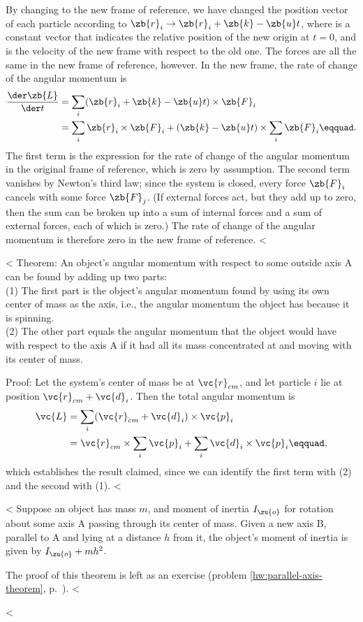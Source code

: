 By changing to the new frame of reference, we have changed
the position vector of each particle according to $\zb{r}_i \rightarrow \zb{r}_i+\zb{k}-\zb{u}t$,
where  is a constant vector that indicates the relative position of the new
origin at $t=0$, and  is the velocity of the new frame with respect to the old one.
The forces are all the same in the new frame of reference, however.
In the new frame, the rate of change of the angular momentum is
\begin{align*}
		\frac{\der\zb{L}}{\der t}	&= \sum_i
				(\zb{r}_i+\zb{k}-\zb{u}t)\times\zb{F}_i \\
		&= \sum_i \zb{r}_i\times\zb{F}_i
			+ (\zb{k}-\zb{u}t) \times \sum_i \zb{F}_i\eqquad.
\end{align*}
The first term is the expression for the rate of change of the angular
momentum in the original frame of reference, which is zero by
assumption. The second term vanishes by Newton's third law; since the system is
closed, every force $\zb{F}_i$ cancels with some force $\zb{F}_j$.
(If external forces act, but they add up to zero, then the sum can be
broken up into a sum of internal forces and a sum of external forces, each of
which is zero.)
The rate of change of the angular momentum is therefore zero
in the new frame of reference.
<%

<%
Theorem: An object's angular momentum with respect to some outside
axis A can be found by adding up two parts:\\
(1) The first part is the object's angular momentum
found by using its own center of mass as the axis, i.e., the
angular momentum the object has because it is spinning.\\
(2) The other part equals the angular momentum that the object
would have with respect to the axis A if it had all its mass
concentrated at and moving with its center of mass.

Proof: Let the system's center of mass be at  $\vc{r}_{cm}$, and let particle $i$ lie at position $\vc{r}_{cm}+\vc{d}_i$.
Then the total angular momentum is
\begin{align*}
  \vc{L} &= \sum_i (\vc{r}_{cm}+\vc{d}_i)\times\vc{p}_i \\
         &= \vc{r}_{cm}\times\sum_i \vc{p}_i+\sum_i \vc{d}_i\times\vc{p}_i\eqquad,
\end{align*}
which establishes the result claimed, since we can identify the first term with (2)
and the second with (1).
<%

<%
Suppose an object has mass $m$, and moment of inertia $I_\zu{o}$ for rotation about some axis A
passing through its center of mass. Given a new axis B, parallel to A and lying at a distance $h$ from
it, the object's moment of inertia is given by $I_\zu{o}+mh^2$.

The proof of this theorem is left as an exercise (problem \ref{hw:parallel-axis-theorem}, p.~\pageref{hw:parallel-axis-theorem}).
<%

<%
